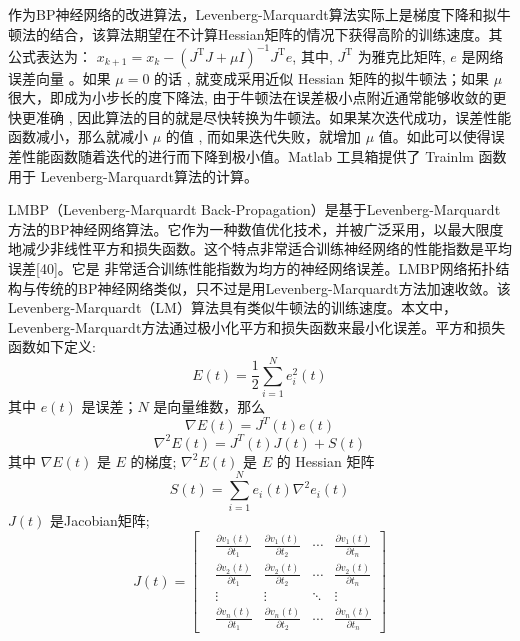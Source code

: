 作为BP神经网络的改进算法，Levenberg-Marquardt算法实际上是梯度下降和拟牛顿法的结合，该算法期望在不计算Hessian矩阵的情况下获得高阶的训练速度。其公式表达为： $x_{k+1} = x_k - (J^{\mathrm{T}}J + \mu I)^{-1} J^{\mathrm{T}}e$, 其中, $J^{\mathrm{T}}$ 为雅克比矩阵, $e$ 是网络误差向量 。如果 $\mu = 0$ 的话 , 就变成采用近似 Hessian 矩阵的拟牛顿法；如果 $\mu$ 很大，即成为小步长的度下降法, 由于牛顿法在误差极小点附近通常能够收敛的更快更准确 , 因此算法的目的就是尽快转换为牛顿法。如果某次迭代成功，误差性能函数减小，那么就减小 $\mu$ 的值 , 而如果迭代失败，就增加 $\mu$ 值。如此可以使得误差性能函数随着迭代的进行而下降到极小值。Matlab 工具箱提供了 Trainlm 函数用于 Levenberg-Marquardt算法的计算。


LMBP（Levenberg-Marquardt Back-Propagation）是基于Levenberg-Marquardt方法的BP神经网络算法。它作为一种数值优化技术，并被广泛采用，以最大限度地减少非线性平方和损失函数。这个特点非常适合训练神经网络的性能指数是平均误差[40]。它是
非常适合训练性能指数为均方的神经网络误差。LMBP网络拓扑结构与传统的BP神经网络类似，只不过是用Levenberg-Marquardt方法加速收敛。该Levenberg-Marquardt（LM）算法具有类似牛顿法的训练速度。本文中，Levenberg-Marquardt方法通过极小化平方和损失函数来最小化误差。平方和损失函数如下定义:
\begin{equation}
    E(t) = \frac{1}{2} \sum_{i=1}^{N} e_i^2(t)
    \label{intro:squareError}
\end{equation}
其中 $e(t)$ 是误差；$N$ 是向量维数，那么
\begin{equation}
    \nabla E(t) = J^{T}(t) e(t)
    \label{intro:gradientE}
\end{equation}
\begin{equation}
    \nabla^2 E(t) = J^{T}(t)J(t) + S(t)
    \label{intro:hessianE}
\end{equation}
其中 $\nabla E(t)$ 是 $E$ 的梯度; $\nabla^2 E(t)$ 是 $E$ 的 Hessian 矩阵
\begin{equation}
    S(t) = \sum_{i=1}^N e_i(t) \nabla^2e_i(t)
    \label{intro:hessianRem}
\end{equation}
$J(t)$ 是Jacobian矩阵;
\begin{equation}
    J(t) = 
    \begin{bmatrix}
        &\frac{\partial v_1(t)}{\partial t_1} &\frac{\partial v_1(t)}{\partial t_2} &\cdots &\frac{\partial v_1(t)}{\partial t_n} \\
        &\frac{\partial v_2(t)}{\partial t_1} &\frac{\partial v_2(t)}{\partial t_2} &\cdots &\frac{\partial v_2(t)}{\partial t_n} \\
        &\vdots &\vdots &\ddots &\vdots \\
        &\frac{\partial v_n(t)}{\partial t_1} &\frac{\partial v_n(t)}{\partial t_2} &\cdots &\frac{\partial v_n(t)}{\partial t_n}
    \end{bmatrix}
\end{equation}

